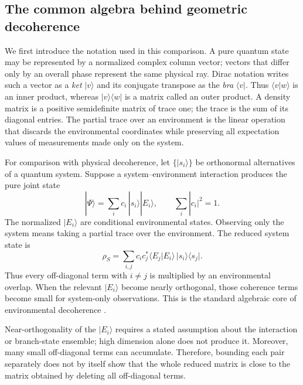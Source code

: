 \documentclass[
  aps,
  reprint,
  superscriptaddress,
  floatfix,
  nofootinbib,
  longbibliography
]{revtex4-2}
\begin{document}
\subsection{The common algebra behind geometric decoherence}
\label{app:dirac}

We first introduce the notation used in this comparison.  A pure quantum
state may be represented by a normalized complex column vector; vectors that
differ only by an overall phase represent the same physical ray.  Dirac
notation writes such a vector as a
\emph{ket} $|v\rangle$ and its conjugate transpose as the \emph{bra}
$\langle v|$.  Thus $\langle v|w\rangle$ is an inner product, whereas
$|v\rangle\langle w|$ is a matrix called an outer product.  A density matrix
is a positive semidefinite matrix of trace one; the trace is the sum of its
diagonal entries.  The partial trace over an environment is the linear
operation that discards the environmental coordinates while preserving all
expectation values of measurements made only on the system.

For comparison with physical decoherence, let
$\{|s_i\rangle\}$ be orthonormal alternatives of a quantum system.  Suppose a
system--environment interaction produces the pure joint state
\begin{equation}
 |\Psi\rangle=\sum_i c_i\,|s_i\rangle|E_i\rangle,
 \qquad \sum_i|c_i|^2=1.
 \label{eq:branch-state-app}
\end{equation}
The normalized $|E_i\rangle$ are conditional environmental states.  Observing
only the system means taking a partial trace over the environment.  The
reduced system state is
\begin{equation}
 \rho_S
 =\sum_{i,j}c_i c_j^*
 \langle E_j|E_i\rangle\,|s_i\rangle\langle s_j|.
 \label{eq:reduced-state-app}
\end{equation}
Thus every off-diagonal term with $i\ne j$ is multiplied by an environmental
overlap.  When the relevant $|E_i\rangle$ become nearly orthogonal, those
coherence terms become small for system-only observations.  This is the
standard algebraic core of environmental decoherence
\cite{RevModPhys.75.715}.

Near-orthogonality of the $|E_i\rangle$ requires a stated assumption about the
interaction or branch-state ensemble; high dimension alone does not produce
it.  Moreover, many small off-diagonal terms can accumulate.  Therefore,
bounding each pair separately does not by itself show that the whole reduced
matrix is close to the matrix obtained by deleting all off-diagonal terms.
\end{document}
